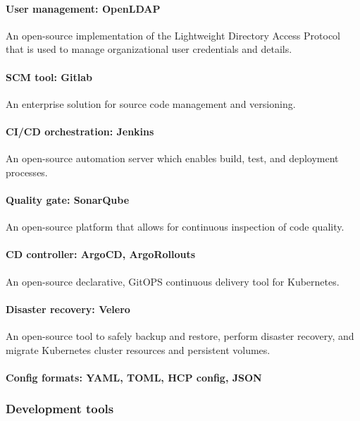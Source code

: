 \paragraph{User management: OpenLDAP }

An open-source implementation of the Lightweight Directory Access Protocol that is used to manage organizational user credentials and details. 

\paragraph{SCM tool: Gitlab }

An enterprise solution for source code management and versioning. 

\paragraph{CI/CD orchestration: Jenkins }

An open-source automation server which enables build, test, and deployment processes. 

\paragraph{Quality gate: SonarQube }

An open-source platform that allows for continuous inspection of code quality. 

\paragraph{CD controller: ArgoCD, ArgoRollouts }

An open-source declarative, GitOPS continuous delivery tool for Kubernetes. 

\paragraph{Disaster recovery: Velero }

An open-source tool to safely backup and restore, perform disaster recovery, and migrate Kubernetes cluster resources and persistent volumes. 

\paragraph{Config formats: YAML, TOML, HCP config, JSON }

\subsubsection{Development tools }

